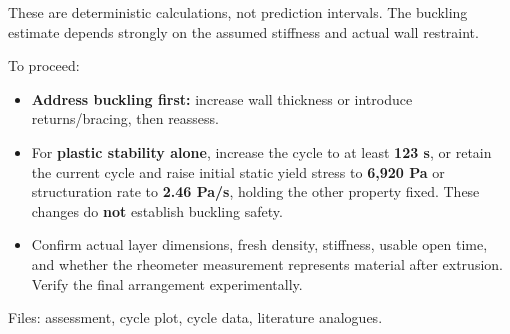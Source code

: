 \begin{agentbox}
\par
These are deterministic calculations, not prediction intervals. The buckling estimate depends strongly on the assumed stiffness and actual wall restraint.\par
\par
To proceed:\par
\par
\begin{itemize}[nosep,leftmargin=1.2em]
\item \textbf{Address buckling first:} increase wall thickness or introduce returns/bracing, then reassess.
\item For \textbf{plastic stability alone}, increase the cycle to at least \textbf{123 s}, or retain the current cycle and raise initial static yield stress to \textbf{6,920 Pa} or structuration rate to \textbf{2.46 Pa/s}, holding the other property fixed. These changes do \textbf{not} establish buckling safety.
\item Confirm actual layer dimensions, fresh density, stiffness, usable open time, and whether the rheometer measurement represents material after extrusion. Verify the final arrangement experimentally.
\end{itemize}
Files: assessment, cycle plot, cycle data, literature analogues.\par
\par
\end{agentbox}